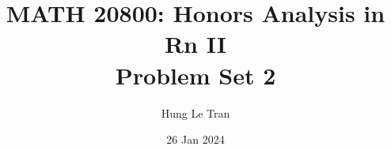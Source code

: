 \documentclass[a4paper, 12pt]{article}
\title{MATH 20800: Honors Analysis in Rn II \\ \large Problem Set 2}
\date{26 Jan 2024}
\author{Hung Le Tran}
\begin{document}
\maketitle
\setcounter{section}{2}
\begin{problem} [Problem 1]
\end{problem}
\begin{solution}
\end{solution}
\end{document}

